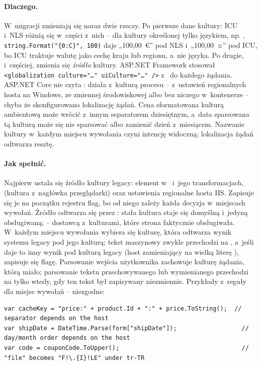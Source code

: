 \paragraph{Dlaczego.} W~migracji zmieniają się naraz dwie rzeczy. Po pierwsze dane kultury:
ICU i~NLS różnią się w~części z~nich -- dla kultury określonej tylko językiem, np.
, \texttt{string.Format("\{0:C\}", 100)} daje „100,00~€” pod NLS
i~„100,00~¤” pod ICU, bo ICU traktuje walutę jako cechę kraju lub regionu, a~nie języka. Po
drugie, i~częściej, zmienia się \emph{źródło} kultury. ASP.NET Framework stosował
\texttt{<globalization culture="…" uiCulture="…" />} z~ do każdego
żądania. ASP.NET Core nie czyta : działa z~kulturą procesu -- z~ustawień
regionalnych hosta na Windows, ze zmiennej środowiskowej albo bez niczego w~kontenerze --
chyba że skonfigurowano lokalizację żądań. Cena sformatowana kulturą ambientową może wrócić
z~innym separatorem dziesiętnym, a~data sparsowana tą kulturą może się nie sparsować albo
zamienić dzień z~miesiącem. Nazwanie kultury w~każdym miejscu wywołania czyni intencję
widoczną; lokalizacja żądań odtwarza resztę.

\paragraph{Jak spełnić.} Najpierw ustala się źródło kultury legacy: element
 w~ i~jego transformacjach,
 (kultura z~nagłówka  przeglądarki)
oraz ustawienia regionalne hosta IIS. Zapisuje się je na początku rejestru flag, bo od niego
zależy każda decyzja w~miejscach wywołań. Źródło odtwarza się przez
: stała kultura staje się domyślną i~jedyną obsługiwaną;
 -- dostawcą  z~kulturami, które strona
faktycznie obsługiwała. W~każdym miejscu wywołania wybiera się kulturę, która odtwarza wynik
systemu legacy pod jego kulturą; tekst maszynowy zwykle przechodzi na
, a~jeśli daje to inny wynik pod kulturą legacy (host
 zamieniający na wielką literę ), zapisuje się flagę. Parsowanie
wejścia użytkownika zachowuje kulturę żądania, którą miało; parsowanie tekstu
przechowywanego lub wymienianego przechodzi na  tylko wtedy, gdy
ten tekst był zapisywany niezmiennie. Przykłady z~reguły dla miejsc wywołań -- niezgodne:

\begin{lstlisting}[escapechar=!]
var cacheKey = "price:" + product.Id + ":" + price.ToString();  // separator depends on the host
var shipDate = DateTime.Parse(form["shipDate"]);                  // day/month order depends on the host
var code = couponCode.ToUpper();                                  // "file" becomes "F!\.{I}!LE" under tr-TR
\end{lstlisting}

